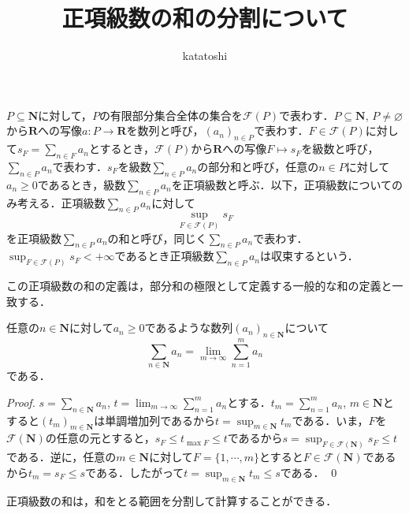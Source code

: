 \documentclass[12pt,a4paper]{jsarticle}
\newcommand{\nat}{\mathbf{N}}
\newcommand{\real}{\mathbf{R}}
\newcommand{\calF}{\mathcal{F}}
\begin{document}
\title{正項級数の和の分割について}
\author{katatoshi}
\maketitle

$P \subseteq \nat$に対して，$P$の有限部分集合全体の集合を$\calF(P)$で表わす．$P \subseteq \nat$, $P \not= \varnothing$から$\real$への写像$a\colon P \to \real$を数列と呼び，$(a_n)_{n \in P}$で表わす．$F \in \calF(P)$に対して$s_F = \sum_{n \in F} a_n$とするとき，$\calF(P)$から$\real$への写像$F \mapsto s_F$を級数と呼び，$\sum_{n \in P} a_n$で表わす．$s_F$を級数$\sum_{n \in P} a_n$の部分和と呼び，任意の$n \in P$に対して$a_n \geq 0$であるとき，級数$\sum_{n \in P} a_n$を正項級数と呼ぶ．以下，正項級数についてのみ考える．正項級数$\sum_{n \in P} a_n$に対して
\begin{equation*}
    \sup_{F \in \calF(P)} s_F
\end{equation*}
を正項級数$\sum_{n \in P} a_n$の和と呼び，同じく$\sum_{n \in P} a_n$で表わす．$\sup_{F \in \calF(P)} s_F < +\infty$であるとき正項級数$\sum_{n \in P} a_n$は収束するという．

この正項級数の和の定義は，部分和の極限として定義する一般的な和の定義と一致する．

\begin{proposition}
    任意の$n \in \nat$に対して$a_n \geq 0$であるような数列$(a_n)_{n \in \nat}$について
    \begin{equation*}
        \sum_{n \in \nat} a_n = \lim_{m \to \infty} \sum_{n = 1}^m a_n
    \end{equation*}
    である．
\end{proposition}
\begin{proof}
    $s = \sum_{n \in \nat} a_n$, $t = \lim_{m \to \infty} \sum_{n = 1}^m a_n$とする．$t_m = \sum_{n = 1}^m a_n$, $m \in \nat$とすると$(t_m)_{m \in \nat}$は単調増加列であるから$t = \sup_{m \in \nat} t_m$である．いま，$F$を$\calF(\nat)$の任意の元とすると，$s_F \leq t_{\max F} \leq t$であるから$s = \sup_{F \in \calF(\nat)} s_F \leq t$である．逆に，任意の$m \in \nat$に対して$F = \{1, \cdots, m\}$とすると$F \in \calF(\nat)$であるから$t_m = s_F \leq s$である．したがって$t = \sup_{m \in \nat} t_m \leq s$である．
    \qed
\end{proof}

正項級数の和は，和をとる範囲を分割して計算することができる．
\end{document}
